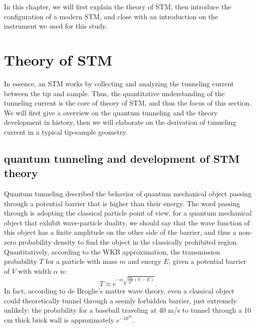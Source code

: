 In this chapter, we will first explain the theory of \ac{STM}, then introduce the configuration of a modern \ac{STM}, and close with an introduction on the instrument we used for this study. 

\section{Theory of STM}
In essence, an \ac{STM} works by collecting and analyzing the tunneling current between the tip and sample. Thus, the quantitative understanding of the tunneling current is the core of theory of \ac{STM}, and thus the focus of this section. We will first give a overview on the quantum tunneling and the theory development in history, then we will elaborate on the derivation of tunneling current in a typical tip-sample geometry.

\subsection{quantum tunneling and development of STM theory}
Quantum tunneling described the behavior of quantum mechanical object passing through a potential barrier that is higher than their energy. The word passing through is adopting the classical particle point of view, for a quantum mechanical object that exhibit wave-particle duality, we should say that the wave function of this object has a finite amplitude on the other side of the barrier, and thus a non-zero probability density to find the object in the classically prohibited region. Quantitatively, according to the WKB approximation, the transmission probability $T$ for a particle with mass $m$ and energy $E$, given a potential barrier of $V$ with width $\alpha$ is: 
\begin{equation}
	T \approx e^{-\alpha\sqrt{\frac{8m}{\hslash^2}(V-E)}}. 
\end{equation}
In fact, according to de Broglie's  matter wave theory, even a classical object could theoretically tunnel through a seemly forbidden barrier, just extremely unlikely: the probability for a baseball traveling at 40 m/s to tunnel through a 10 cm thick brick wall is approximately $e^{-10^{33}}$. 

